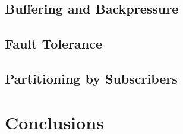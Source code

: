 \subsection{Buffering and Backpressure}

\subsection{Fault Tolerance}

\subsection{Partitioning by Subscribers}
\clearpage
\section{Conclusions}
